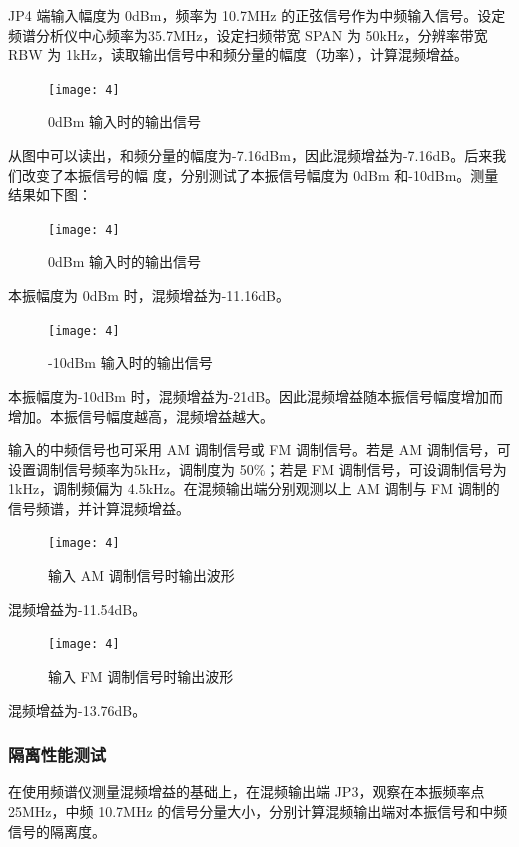 \documentclass{../source/Experiment}
\begin{document}
            JP4 端输入幅度为 0dBm，频率为 10.7MHz 的正弦信号作为中频输入信号。设定频谱分析仪中心频率为35.7MHz，设定扫频带宽 SPAN 为 50kHz，分辨率带宽 RBW 为 1kHz，读取输出信号中和频分量的幅度（功率），计算混频增益。
            
            \begin{figure}[H]
                \centering
                \texttt{[image: 4]}
                \caption{ 0dBm 输入时的输出信号}
            \end{figure}
            从图中可以读出，和频分量的幅度为-7.16dBm，因此混频增益为-7.16dB。后来我们改变了本振信号的幅
            度，分别测试了本振信号幅度为 0dBm 和-10dBm。测量结果如下图：
            \begin{figure}[H]
                \centering
                \texttt{[image: 4]}
                \caption{0dBm 输入时的输出信号}
            \end{figure}

            本振幅度为 0dBm 时，混频增益为-11.16dB。

            \begin{figure}[H]
                \centering
                \texttt{[image: 4]}
                \caption{-10dBm 输入时的输出信号}
            \end{figure}

            本振幅度为-10dBm 时，混频增益为-21dB。因此混频增益随本振信号幅度增加而增加。本振信号幅度越高，混频增益越大。

            输入的中频信号也可采用 AM 调制信号或 FM 调制信号。若是 AM 调制信号，可设置调制信号频率为5kHz，调制度为 50\%；若是 FM 调制信号，可设调制信号为 1kHz，调制频偏为 4.5kHz。在混频输出端分别观测以上 AM 调制与 FM 调制的信号频谱，并计算混频增益。

            \begin{figure}[H]
                \centering
                \texttt{[image: 4]}
                \caption{输入 AM 调制信号时输出波形}
            \end{figure}

            混频增益为-11.54dB。

            \begin{figure}[H]
                \centering
                \texttt{[image: 4]}
                \caption{输入 FM 调制信号时输出波形}
            \end{figure}
            混频增益为-13.76dB。
        \subsubsection{隔离性能测试}
        在使用频谱仪测量混频增益的基础上，在混频输出端 JP3，观察在本振频率点 25MHz，中频 10.7MHz 的信号分量大小，分别计算混频输出端对本振信号和中频信号的隔离度。
\end{document}
